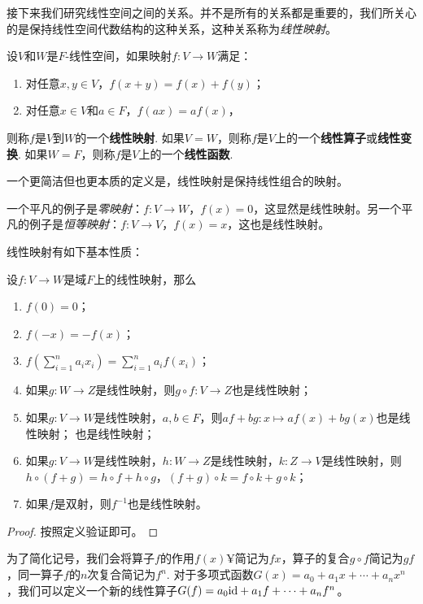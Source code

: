 接下来我们研究线性空间之间的关系。并不是所有的关系都是重要的，我们所关心的是保持线性空间代数结构的这种关系，这种关系称为\emph{线性映射}。

\begin{definition}
设$V$和$W$是$F$-线性空间，如果映射$f:V\to W$满足：
\begin{enumerate}
    \item 对任意$x,y\in V$，$f(x+y)=f(x)+f(y)$；
    \item 对任意$x\in V$和$a\in F$，$f(ax)=af(x)$，
\end{enumerate}
则称$f$是$V$到$W$的一个\textbf{线性映射}. 如果$V=W$，则称$f$是$V$上的一个\textbf{线性算子}或\textbf{线性变换}. 如果$W=F$，则称$f$是$V$上的一个\textbf{线性函数}.
\end{definition}
一个更简洁但也更本质的定义是，线性映射是保持线性组合的映射。

一个平凡的例子是\emph{零映射}：$f:V\to W$，$f(x)=0$，这显然是线性映射。另一个平凡的例子是\emph{恒等映射}：$f:V\to V$，$f(x)=x$，这也是线性映射。

线性映射有如下基本性质：

\begin{proposition}\label{prop:linear-map-basic}
设$f:V\to W$是域$F$上的线性映射，那么
\begin{enumerate}
    \item $f(0)=0$；
    \item $f(-x)=-f(x)$；
    \item $f(\sum_{i=1}^n a_ix_i)=\sum_{i=1}^n a_if(x_i)$；
    \item 如果$g:W\to Z$是线性映射，则$g\circ f:V\to Z$也是线性映射；
    \item 如果$g:V\to W$是线性映射，$a,b\in F$，则$af+bg:x\mapsto af(x)+bg(x)$也是线性映射；
    也是线性映射；
    \item 如果$g:V\to W$是线性映射，$h:W\to Z$是线性映射，$k:Z\to V$是线性映射，则$h\circ(f+g)=h\circ f+h\circ g$，$(f+g)\circ k = f\circ k+g\circ k$；
    \item 如果$f$是双射，则$f^{-1}$也是线性映射。
\end{enumerate}
\end{proposition}
\begin{proof}
    按照定义验证即可。
\end{proof}

为了简化记号，我们会将算子$f$的作用$f(x)¥$简记为$fx$，算子的复合$g\circ f$简记为$gf$，同一算子$f$的$n$次复合简记为$f^n$. 对于多项式函数$G(x)=a_0+a_1x+\cdots+a_nx^n$，我们可以定义一个新的线性算子$G(f)=a_0\mathrm{id}+a_1f+\cdots+a_nf^n$。

